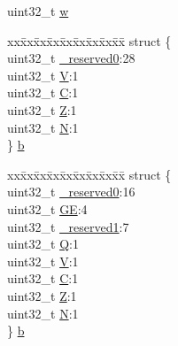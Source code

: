\begin{DoxyCompactItemize}
\begin{tabbing}
\end{tabbing}\item 
uint32\+\_\+t \mbox{\hyperlink{union_a_p_s_r___type_ad0fb62e7a08e70fc5e0a76b67809f84b}{w}}
\item 
\begin{tabbing}
xx\=xx\=xx\=xx\=xx\=xx\=xx\=xx\=xx\=\kill
struct \{\\
\>uint32\_t \mbox{\hyperlink{union_a_p_s_r___type_ac8a6a13838a897c8d0b8bc991bbaf7c1}{\_reserved0}}:28\\
\>uint32\_t \mbox{\hyperlink{union_a_p_s_r___type_acd4a2b64faee91e4a9eef300667fa222}{V}}:1\\
\>uint32\_t \mbox{\hyperlink{union_a_p_s_r___type_a7a1caf92f32fe9ebd8d1fe89b06c7776}{C}}:1\\
\>uint32\_t \mbox{\hyperlink{union_a_p_s_r___type_a5ae954cbd9986cd64625d7fa00943c8e}{Z}}:1\\
\>uint32\_t \mbox{\hyperlink{union_a_p_s_r___type_abae0610bc2a97bbf7f689e953e0b451f}{N}}:1\\
\} \mbox{\hyperlink{union_a_p_s_r___type_ae76e72348ad0deba5d762ba382059fa6}{b}}\\

\end{tabbing}\item 
\begin{tabbing}
xx\=xx\=xx\=xx\=xx\=xx\=xx\=xx\=xx\=\kill
struct \{\\
\>uint32\_t \mbox{\hyperlink{union_a_p_s_r___type_ac8a6a13838a897c8d0b8bc991bbaf7c1}{\_reserved0}}:16\\
\>uint32\_t \mbox{\hyperlink{union_a_p_s_r___type_aa91800ec6e90e457c7a1acd1f2e17099}{GE}}:4\\
\>uint32\_t \mbox{\hyperlink{union_a_p_s_r___type_a959a73d8faee56599b7e792a7c5a2d16}{\_reserved1}}:7\\
\>uint32\_t \mbox{\hyperlink{union_a_p_s_r___type_a65f27ddc4f7e09c14ce7c5211b2e000a}{Q}}:1\\
\>uint32\_t \mbox{\hyperlink{union_a_p_s_r___type_acd4a2b64faee91e4a9eef300667fa222}{V}}:1\\
\>uint32\_t \mbox{\hyperlink{union_a_p_s_r___type_a7a1caf92f32fe9ebd8d1fe89b06c7776}{C}}:1\\
\>uint32\_t \mbox{\hyperlink{union_a_p_s_r___type_a5ae954cbd9986cd64625d7fa00943c8e}{Z}}:1\\
\>uint32\_t \mbox{\hyperlink{union_a_p_s_r___type_abae0610bc2a97bbf7f689e953e0b451f}{N}}:1\\
\} \mbox{\hyperlink{union_a_p_s_r___type_a1611cae6e74a7581fbca5c223e7290c9}{b}}\\


\end{tabbing}
\end{DoxyCompactItemize}
